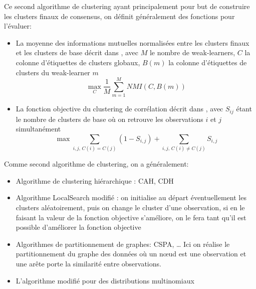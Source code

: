   	  Ce second algorithme de clustering ayant principalement pour but de construire les clusters finaux de consensus, on définit généralement des fonctions pour l'évaluer:
  	  \begin{itemize}
  		  \item La moyenne des informations mutuelles normalisées entre les clusters finaux et les clusters de base décrit dans \cite{strehl2002cluster}, avec $M$ le nombre de weak-learners, $C$ la colonne d'étiquettes de clusters globaux, $B(m)$ la colonne d'étiquettes de clusters du weak-learner $m$
  		  \begin{equation}
  			  \max_C \frac{1}{M}\sum_{m=1}^{M} NMI(C, B(m))
  		  \end{equation}
  		  \item La fonction objective du clustering de corrélation décrit dans \cite{gionis2007clustering}, avec $S_{ij}$ étant le nombre de clusters de base où on retrouve les observations $i$ et $j$ simultanément
  		  \begin{equation}
  			  \max \sum_{i,j \text{, } C(i)=C(j)} (1 - S_{i,j}) + \sum_{{i,j} \text{, } C(i) \neq C(j)}  S_{i,j}
  		  \end{equation}
  	  \end{itemize}
 	 
  	  Comme second algorithme de clustering, on a généralement:
  	  \begin{itemize}
  		  \item Algorithme de clustering hiérarchique \cite{gionis2007clustering}: \acrshort{CAH}, \acrshort{CDH}

  		  \item Algorithme LocalSearch modifié \cite{gionis2007clustering}:
  		  on initialise au départ éventuellement les clusters aléatoirement, puis on change le cluster d'une observation,
  		  si en le faisant la valeur de la fonction objective s'améliore, on le fera tant qu'il est possible d'améliorer la fonction objective
    
  		  \item Algorithmes de partitionnement de graphes: \acrfull{CSPA}, \dots
  		  Ici on réalise le partitionnement du graphe des données où un nœud est une observation et une arête porte la similarité entre observations.
     	 
  		  \item L'algorithme  modifié %
          pour des distributions multinomiaux
  	  \end{itemize}

